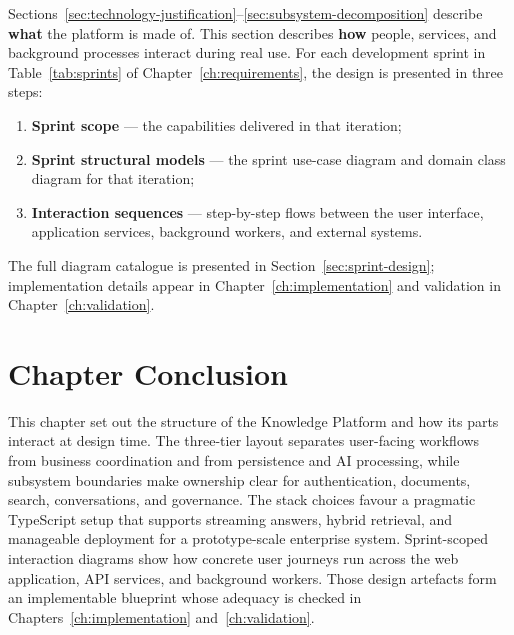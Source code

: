 Sections~\ref{sec:technology-justification}--\ref{sec:subsystem-decomposition} describe
\textbf{what} the platform is made of. This section describes \textbf{how} people,
services, and background processes interact during real use. For each development
sprint in Table~\ref{tab:sprints} of Chapter~\ref{ch:requirements}, the design is
presented in three steps:
\begin{enumerate}[leftmargin=*,itemsep=0.2em]
  \item \textbf{Sprint scope} --- the capabilities delivered in that iteration;
  \item \textbf{Sprint structural models} --- the sprint use-case diagram and domain class diagram for that iteration;
  \item \textbf{Interaction sequences} --- step-by-step flows between the user interface, application services, background workers, and external systems.
\end{enumerate}
The full diagram catalogue is presented in Section~\ref{sec:sprint-design}; implementation
details appear in Chapter~\ref{ch:implementation} and validation in
Chapter~\ref{ch:validation}.



\section{Chapter Conclusion}

This chapter set out the structure of the Knowledge Platform and how its parts
interact at design time. The three-tier layout separates user-facing workflows from
business coordination and from persistence and AI processing, while subsystem
boundaries make ownership clear for authentication, documents, search,
conversations, and governance. The stack choices favour a pragmatic TypeScript
setup that supports streaming answers, hybrid retrieval, and manageable deployment
for a prototype-scale enterprise system. Sprint-scoped interaction diagrams show
how concrete user journeys run across the web application, API services, and
background workers. Those design artefacts form an implementable blueprint whose
adequacy is checked in Chapters~\ref{ch:implementation} and~\ref{ch:validation}.
